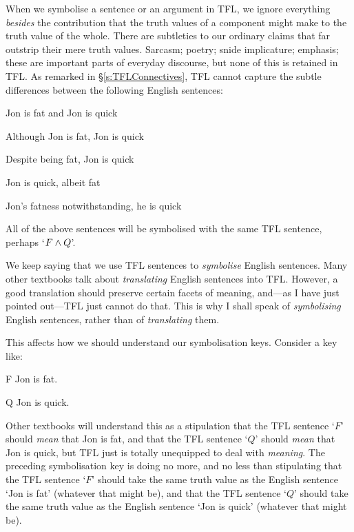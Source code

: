 When we symbolise a sentence or an argument in TFL, we ignore everything \emph{besides} the contribution that the truth values of a component might make to the truth value of the whole. There are subtleties to our ordinary claims that far outstrip their mere truth values. Sarcasm; poetry; snide implicature; emphasis; these are important parts of everyday discourse, but none of this is retained in TFL. As remarked in \S\ref{s:TFLConnectives}, TFL cannot capture the subtle differences between the following English sentences:
	\begin{earg}
		\item Jon is fat and Jon is quick
		\item Although Jon is fat, Jon is quick
		\item Despite being fat, Jon is quick
		\item Jon is quick, albeit fat
		\item Jon's fatness notwithstanding, he is quick
	\end{earg}
All of the above sentences will be symbolised with the same TFL sentence, perhaps `$F \wedge Q$'.

We keep saying that we use TFL sentences to \emph{symbolise} English sentences. Many other textbooks talk about \emph{translating} English sentences into TFL. However, a good translation should preserve certain facets of meaning, and---as I have just pointed out---TFL just cannot do that. This is why I shall speak of \emph{symbolising} English sentences, rather than of \emph{translating} them.

This affects how we should understand our symbolisation keys. Consider a key like:
	\begin{ekey}
		\item[F] Jon is fat.
		\item[Q] Jon is quick.
	\end{ekey}
Other textbooks will understand this as a stipulation that the TFL sentence `$F$' should \emph{mean} that Jon is fat, and that the TFL sentence `$Q$' should \emph{mean} that Jon is quick, but TFL just is totally unequipped to deal with \emph{meaning}. The preceding symbolisation key is doing no more, and no less than stipulating that the TFL sentence `$F$' should take the same truth value as the English sentence `Jon is fat' (whatever that might be), and that the TFL sentence `$Q$' should take the same truth value as the English sentence `Jon is quick' (whatever that might be). 


